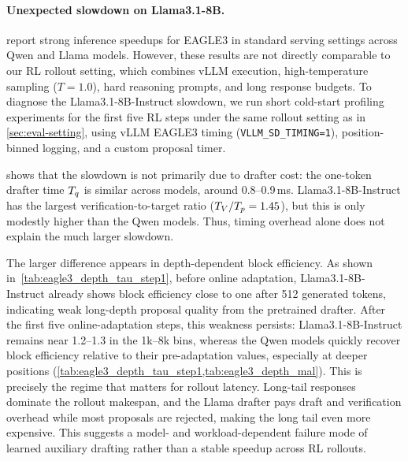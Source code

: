 \paragraph{Unexpected slowdown on Llama3.1-8B.}

\citet{li2025eagle} report strong inference speedups for EAGLE3 in standard serving settings across Qwen and Llama models.
However, these results are not directly comparable to our RL rollout setting, which combines vLLM execution, high-temperature sampling ($T=1.0$), hard reasoning prompts, and long response budgets.
To diagnose the Llama3.1-8B-Instruct slowdown, we run short cold-start profiling experiments for the first five RL steps under the same rollout setting as in \cref{sec:eval-setting}, using vLLM EAGLE3 timing (\texttt{VLLM\_SD\_TIMING=1}), position-binned \MAL{} logging, and a custom proposal timer.

 shows that the slowdown is not primarily due to drafter cost: the one-token drafter time $T_q$ is similar across models, around 0.8--0.9\,ms.
Llama3.1-8B-Instruct has the largest verification-to-target ratio ($T_V/T_p=1.45$), but this is only modestly higher than the Qwen models.
Thus, timing overhead alone does not explain the much larger slowdown.

The larger difference appears in depth-dependent block efficiency.
As shown in~\cref{tab:eagle3_depth_tau_step1}, before online adaptation, Llama3.1-8B-Instruct already shows block efficiency close to one after 512 generated tokens, indicating weak long-depth proposal quality from the pretrained drafter.
After the first five online-adaptation steps, this weakness persists: Llama3.1-8B-Instruct remains near 1.2--1.3 in the 1k--8k bins, whereas the Qwen models quickly recover block efficiency relative to their pre-adaptation values, especially at deeper positions (\cref{tab:eagle3_depth_tau_step1,tab:eagle3_depth_mal}).
This is precisely the regime that matters for rollout latency.
Long-tail responses dominate the rollout makespan, and the Llama drafter pays draft and verification overhead while most proposals are rejected, making the long tail even more expensive.
This suggests a model- and workload-dependent failure mode of learned auxiliary drafting rather than a stable speedup across RL rollouts.

